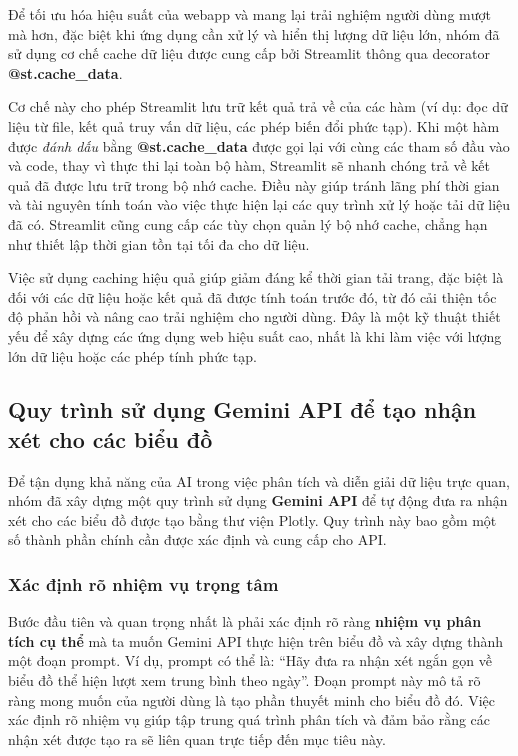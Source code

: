 Để tối ưu hóa hiệu suất của webapp và mang lại trải nghiệm người dùng mượt mà hơn, đặc biệt khi ứng dụng cần xử lý và hiển thị lượng dữ liệu lớn, nhóm đã sử dụng cơ chế cache dữ liệu được cung cấp bởi Streamlit thông qua decorator \textbf{@st.cache\_data}.

Cơ chế này cho phép Streamlit lưu trữ kết quả trả về của các hàm (ví dụ: đọc dữ liệu từ file, kết quả truy vấn dữ liệu, các phép biến đổi phức tạp). Khi một hàm được \textit{đánh dấu} bằng \textbf{@st.cache\_data} được gọi lại với cùng các tham số đầu vào và code, thay vì thực thi lại toàn bộ hàm, Streamlit sẽ nhanh chóng trả về kết quả đã được lưu trữ trong bộ nhớ cache. Điều này giúp tránh lãng phí thời gian và tài nguyên tính toán vào việc thực hiện lại các quy trình xử lý hoặc tải dữ liệu đã có. Streamlit cũng cung cấp các tùy chọn quản lý bộ nhớ cache, chẳng hạn như thiết lập thời gian tồn tại tối đa cho dữ liệu.

Việc sử dụng caching hiệu quả giúp giảm đáng kể thời gian tải trang, đặc biệt là đối với các dữ liệu hoặc kết quả đã được tính toán trước đó, từ đó cải thiện tốc độ phản hồi và nâng cao trải nghiệm cho người dùng. Đây là một kỹ thuật thiết yếu để xây dựng các ứng dụng web hiệu suất cao, nhất là khi làm việc với lượng lớn dữ liệu hoặc các phép tính phức tạp.

\subsection{Quy trình sử dụng Gemini API để tạo nhận xét cho các biểu đồ}

Để tận dụng khả năng của AI trong việc phân tích và diễn giải dữ liệu trực quan, nhóm đã xây dựng một quy trình sử dụng \textbf{Gemini API} để tự động đưa ra nhận xét cho các biểu đồ được tạo bằng thư viện Plotly. Quy trình này bao gồm một số thành phần chính cần được xác định và cung cấp cho API.

\subsubsection{Xác định rõ nhiệm vụ trọng tâm}

Bước đầu tiên và quan trọng nhất là phải xác định rõ ràng \textbf{nhiệm vụ phân tích cụ thể} mà ta muốn Gemini API thực hiện trên biểu đồ và xây dựng thành một đoạn prompt. Ví dụ, prompt có thể là: ``Hãy đưa ra nhận xét ngắn gọn về biểu đồ thể hiện lượt xem trung bình theo ngày''. Đoạn prompt này mô tả rõ ràng mong muốn của người dùng là tạo phần thuyết minh cho biểu đồ đó. Việc xác định rõ nhiệm vụ giúp tập trung quá trình phân tích và đảm bảo rằng các nhận xét được tạo ra sẽ liên quan trực tiếp đến mục tiêu này.

